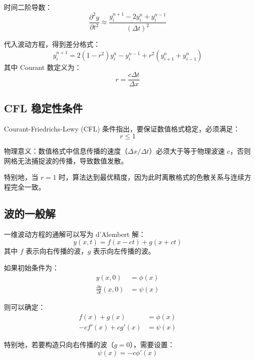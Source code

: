 \documentclass[12pt,a4paper]{article}
\begin{document}
时间二阶导数：
\begin{equation}
\frac{\partial^2 y}{\partial t^2} \approx \frac{y_i^{n+1} - 2y_i^n + y_i^{n-1}}{(\Delta t)^2}
\end{equation}

代入波动方程，得到差分格式：
\begin{equation}
y_i^{n+1} = 2(1-r^2)y_i^n - y_i^{n-1} + r^2(y_{i+1}^n + y_{i-1}^n)
\end{equation}
其中 Courant 数定义为：
\begin{equation}
r = \frac{c\Delta t}{\Delta x}
\end{equation}

\subsection{CFL 稳定性条件}

Courant-Friedrichs-Lewy (CFL) 条件指出，要保证数值格式稳定，必须满足：
\begin{equation}
r \leq 1
\end{equation}

物理意义：数值格式中信息传播的速度（$\Delta x / \Delta t$）必须大于等于物理波速 $c$，否则网格无法捕捉波的传播，导致数值发散。

特别地，当 $r = 1$ 时，算法达到最优精度，因为此时离散格式的色散关系与连续方程完全一致。

\subsection{波的一般解}

一维波动方程的通解可以写为 d'Alembert 解：
\begin{equation}
y(x,t) = f(x - ct) + g(x + ct)
\end{equation}
其中 $f$ 表示向右传播的波，$g$ 表示向左传播的波。

如果初始条件为：
\begin{align}
y(x,0) &= \phi(x) \\
\frac{\partial y}{\partial t}(x,0) &= \psi(x)
\end{align}

则可以确定：
\begin{align}
f(x) + g(x) &= \phi(x) \\
-cf'(x) + cg'(x) &= \psi(x)
\end{align}

特别地，若要构造只向右传播的波（$g=0$），需要设置：
\begin{equation}
\psi(x) = -c\phi'(x)
\end{equation}
\end{document}
